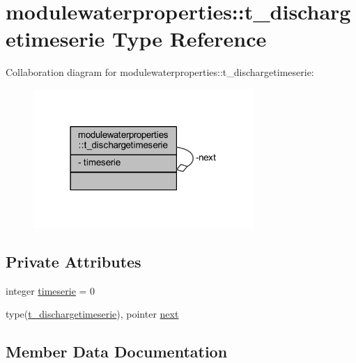 \hypertarget{structmodulewaterproperties_1_1t__dischargetimeserie}{}\section{modulewaterproperties\+:\+:t\+\_\+dischargetimeserie Type Reference}
\label{structmodulewaterproperties_1_1t__dischargetimeserie}


Collaboration diagram for modulewaterproperties\+:\+:t\+\_\+dischargetimeserie\+:\nopagebreak
\begin{figure}[H]
\begin{center}
\leavevmode
\includegraphics[width=237pt]{structmodulewaterproperties_1_1t__dischargetimeserie__coll__graph}
\end{center}
\end{figure}
\subsection*{Private Attributes}
\begin{DoxyCompactItemize}
\item 
integer \mbox{\hyperlink{structmodulewaterproperties_1_1t__dischargetimeserie_a9edd5fc611cf2305c1904643070add8f}{timeserie}} = 0
\item 
type(\mbox{\hyperlink{structmodulewaterproperties_1_1t__dischargetimeserie}{t\+\_\+dischargetimeserie}}), pointer \mbox{\hyperlink{structmodulewaterproperties_1_1t__dischargetimeserie_adb31e9c0c2bc481840b864e9fa027199}{next}}
\end{DoxyCompactItemize}


\subsection{Member Data Documentation}
\mbox{\label{structmodulewaterproperties_1_1t__dischargetimeserie_adb31e9c0c2bc481840b864e9fa027199}} 
